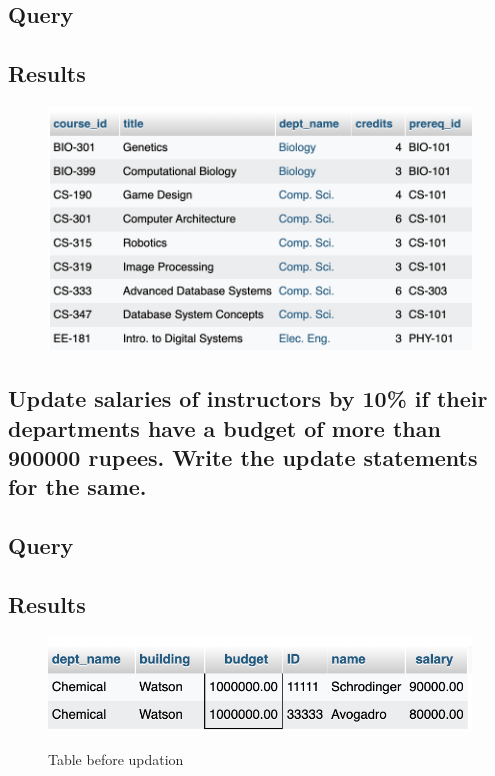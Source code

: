 \documentclass[12pt]{article}
\begin{document}
\subsection*{Query}

\subsection*{Results}
\begin{figure}[!hbt]
    \centering
    \includegraphics[scale=1.1]{screenshots/8b.png}
    \label{fig:my_label1}
\end{figure}
\newpage

\subsection{Update salaries of instructors by 10\% if their departments have a budget of more than 900000 rupees. Write the update statements for the same.}

\subsection*{Query}

\subsection*{Results}
\begin{figure}[!hbt]
    \centering
    \includegraphics[scale=1.1]{screenshots/8c 1.png}
    \label{fig:my_label1}
    \caption{Table before updation}
\end{figure}
\end{document}
